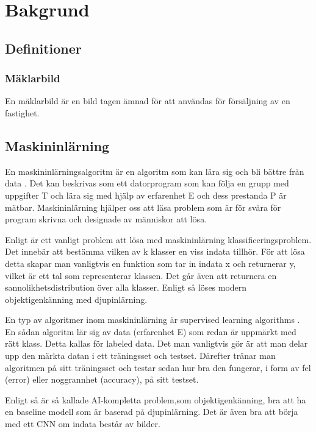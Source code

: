 \documentclass{kththesis}
\begin{document}
\chapter{Bakgrund}
  \section{Definitioner}
    \subsection{Mäklarbild}
    En mäklarbild är en bild tagen ämnad för att användas för försäljning av en fastighet. 

  \section{Maskininlärning}
  En maskininlärningsalgoritm är en algoritm som kan lära sig och bli bättre från data \parencite{Goodfellow-et-al-2016}. Det kan beskrivas som ett datorprogram som kan följa en grupp med uppgifter T och lära sig med hjälp av erfarenhet E och dess prestanda P är mätbar. Maskininlärning hjälper oss att läsa problem som är för svåra för program skrivna och designade av människor att lösa. 

  Enligt \cite{Goodfellow-et-al-2016} är ett vanligt problem att lösa med maskininlärning klassificeringsproblem. Det innebär att bestämma vilken av k klasser en viss indata tillhör. För att lösa detta skapar man vanligtvis en funktion som tar in indata x och returnerar y, vilket är ett tal som representerar klassen. Det går även att returnera en sannolikhetsdistribution över alla klasser. Enligt \cite{Goodfellow-et-al-2016} så löses modern objektigenkänning med djupinlärning.

  En typ av algoritmer inom maskininlärning är supervised learning algorithms \parencite{Goodfellow-et-al-2016}. En sådan algoritm lär sig av data (erfarenhet E) som redan är uppmärkt med rätt klass. Detta kallas för labeled data. Det man vanligtvis gör är att man delar upp den märkta datan i ett träningsset och testset. Därefter tränar man algoritmen på sitt träningsset och testar sedan hur bra den fungerar, i form av fel (error) eller noggrannhet (accuracy), på sitt testset.

  Enligt \parencite{Goodfellow-et-al-2016} så är så kallade AI-kompletta problem,som objektigenkänning, bra att ha en baseline modell som är baserad på djupinlärning. Det är även bra att börja med ett CNN om indata består av bilder. 
\end{document}
